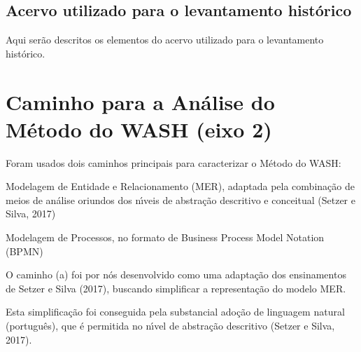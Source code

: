 \documentclass[
12pt,		%
openright,	%
twoside,  %
a4paper,			%
chapter=TITLE,		%
english,			%
french,				%
spanish,			%
brazil				%
]{USPSC-classe/USPSC}
\begin{document}
\subsection[Acervo utilizado para o levantamento hist\'orico]{Acervo utilizado para o levantamento hist\'orico}\label{Acervo utilizado para o levantamento hist\'orico}
Aqui ser\~ao descritos os elementos do acervo utilizado para o levantamento hist\'orico.














\section[Caminho para a An\'alise do M\'etodo do WASH (eixo 2)]{Caminho para a An\'alise do M\'etodo do WASH (eixo 2)}\label{Caminho para a An\'alise do M\'etodo do WASH (eixo 2)}
Foram usados dois caminhos principais para caracterizar o M\'etodo do WASH:















\begin{alineas}
\item Modelagem de Entidade e Relacionamento (MER), adaptada pela combina\c{c}\~ao de meios de an\'alise oriundos dos n\'{\i}veis de abstra\c{c}\~ao descritivo e conceitual (Setzer e Silva, 2017)
\item Modelagem de Processos, no formato de Business Process Model Notation (BPMN)
\end{alineas}

O caminho (a) foi por n\'os desenvolvido como uma adapta\c{c}\~ao dos ensinamentos de  Setzer e Silva (2017), buscando simplificar a representa\c{c}\~ao do modelo MER.














Esta simplifica\c{c}\~ao foi conseguida pela substancial ado\c{c}\~ao de linguagem natural (portugu\^es), que \'e permitida no n\'{\i}vel de abstra\c{c}\~ao descritivo (Setzer e Silva, 2017).
\end{document}
